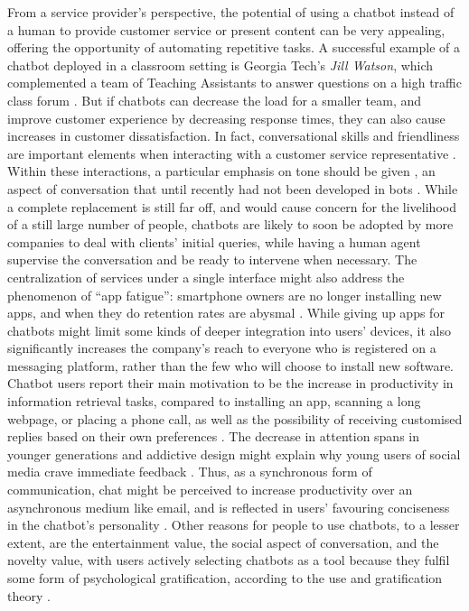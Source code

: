 From a service provider's perspective, the potential of using a chatbot instead of a human to provide customer service or present content can be very appealing, offering the opportunity of automating repetitive tasks. A successful example of a chatbot deployed in a classroom setting is Georgia Tech's \textit{Jill Watson}, which complemented a team of Teaching Assistants to answer questions on a high traffic class forum \cite{Eicher2016}. But if chatbots can decrease the load for a smaller team, and improve customer experience by decreasing response times, they can also cause increases in customer dissatisfaction. In fact, conversational skills and friendliness are important elements when interacting with a customer service representative \cite{Kang2013}. Within these interactions, a particular emphasis on tone should be given \cite{morris1988many}, an aspect of conversation that until recently had not been developed in bots \cite{Hu2018}. While a complete replacement is still far off, and would cause concern for the livelihood of a still large number of people, chatbots are likely to soon be adopted by more companies to deal with clients' initial queries, while having a human agent supervise the conversation and be ready to intervene when necessary. The centralization of services under a single interface might also address the phenomenon of ``app fatigue'': smartphone owners are no longer installing new apps, and when they do retention rates are abysmal \cite{appfatigue}. While giving up apps for chatbots might limit some kinds of deeper integration into users' devices, it also significantly increases the company's reach to everyone who is registered on a messaging platform, rather than the few who will choose to install new software. \\ 
Chatbot users report their main motivation to be the increase in productivity in information retrieval tasks, compared to installing an app, scanning a long webpage, or placing a phone call, as well as the possibility of receiving customised replies based on their own preferences \cite{10.1007/978-3-319-70284-1_30}. The decrease in attention spans in younger generations \cite{Wilmer2017} and addictive design might explain why young users of social media crave immediate feedback \cite{brandtzaeg2016should}. Thus, as a synchronous form of communication, chat might be perceived to increase productivity over an asynchronous medium like email, and is reflected in users' favouring conciseness in the chatbot's personality \cite{10.1007/978-3-319-67744-6_28}. Other reasons for people to use chatbots, to a lesser extent, are the entertainment value, the social aspect of conversation, and the novelty value, with users actively selecting chatbots as a tool because they fulfil some form of psychological gratification, according to the use and gratification theory \cite{10.1007/978-3-319-70284-1_30}. \\
